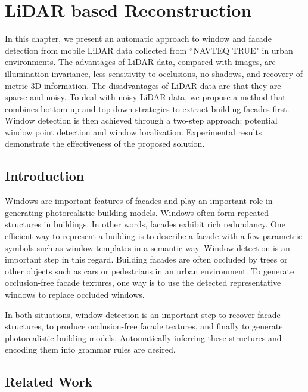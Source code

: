 \chapter{LiDAR based Reconstruction}

In this chapter, we present an automatic approach to window and facade detection from mobile LiDAR data collected from ``NAVTEQ TRUE" in urban environments. The advantages of LiDAR data, compared with images, are illumination invariance, less sensitivity to occlusions, no shadows, and recovery of metric 3D information. The disadvantages of LiDAR data are that they are sparse and noisy. To deal with noisy LiDAR data, we propose a method that combines bottom-up and top-down strategies to extract building facades first. Window detection is then achieved through a two-step approach: potential window point detection and window localization. Experimental results demonstrate the effectiveness of the proposed solution. 
 
\section{Introduction}

Windows are important features of facades and play an important role in generating photorealistic building models. Windows often form repeated structures in buildings. In other words, facades exhibit rich redundancy. One efficient way to represent a building is to describe a facade with a few parametric symbols such as window templates in a semantic way. Window detection is an important step in this regard. Building facades are often occluded by trees or other objects such as cars or pedestrians in an urban environment. To generate occlusion-free facade textures, one way is to use the detected representative windows to replace occluded windows. 

In both situations, window detection is an important step to recover facade structures, to produce occlusion-free facade textures, and finally to generate photorealistic building models. Automatically inferring these structures and encoding them into grammar rules are desired.

\section{Related Work}

